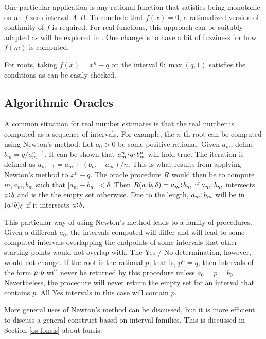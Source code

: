 \documentclass[12pt]{article}
\begin{document}
\begin{enumerate}
\end{enumerate}

One particular application is any rational function that satisfies being monotonic on an $f$-zero interval $A:B$. To conclude that $f(x)=0$, a rationalized version of continuity of $f$ is required. For real functions, this approach can be suitably adapted as will be explored in \cite{taylor23funora}. One change is to have a bit of fuzziness for how $f(m)$ is computed. 

For roots, taking $f(x) = x^n - q$ on the interval $0:\max(q, 1)$ satisfies the conditions as can be easily checked. 

\subsection{Algorithmic Oracles}


A common situation for real number estimates is that the real number is computed as a sequence of intervals. For example, the $n$-th root can be computed using Newton's method. Let $a_0 >0$ be some positive rational. Given $a_m$, define $b_m = q/a_m^{n-1}$. It can be shown that $a_m^n \rint  q \rint  b_m^n$ will hold true. The iteration is defined as $a_{m+1} = a_m + (b_m - a_m)/n$. This is what results from applying Newton's method to $x^n - q$. The oracle procedure $R$ would then be to compute $m, a_m, b_m$ such that $|a_m - b_m| < \delta$.  Then $R(a\rint b, \delta) = a_m\rint b_m$ if $a_m\rint b_m$ intersects $a\rint b$ and is the the empty set otherwise. Due to the length, $a_m\rint b_m$ will be in $\halo{a\rint b}$ if it intersects $a\rint b$. 

This particular way of using Newton's method leads to a family of procedures. Given a different $a_0$, the intervals computed will differ and will lead to some computed intervals overlapping the endpoints of some intervals that other starting points would not overlap with. The Yes / No determination, however, would not  change. If the root is the rational $p$, that is, $p^n = q$,  then intervals of the form $p\rint b$ will never be returned by this procedure unless $a_0 = p = b_0$. Nevertheless, the procedure will never return the empty set for an interval that contains $p$. All Yes intervals in this case will contain $p$. 

More general uses of Newton's method can be discussed, but it is more efficient to discuss a general construct based on interval families. This is discussed in Section \ref{os-fonsis} about fonsis. 
\end{document}

